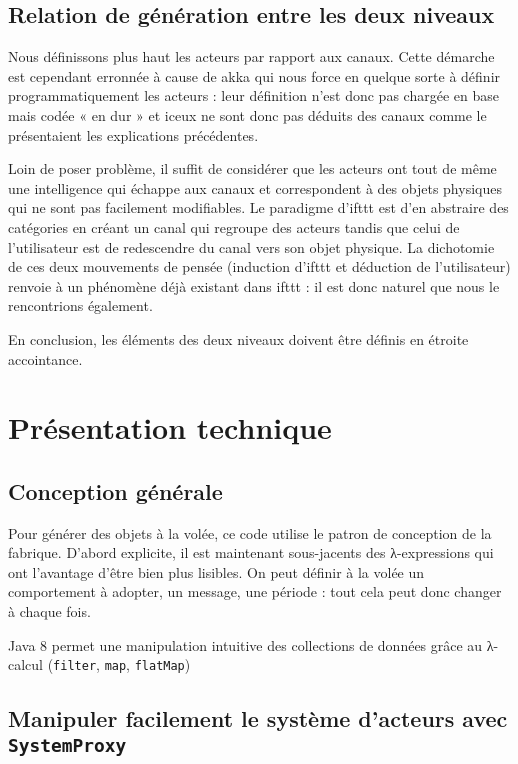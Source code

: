 \documentclass[11pt]{article}
\begin{document}
\subsection{Relation de génération entre les deux niveaux}

Nous définissons plus haut les acteurs par rapport aux canaux. Cette démarche est cependant erronnée à cause de akka qui nous force en quelque sorte à définir programmatiquement les acteurs : leur définition n'est donc pas chargée en base mais codée « en dur » et iceux ne sont donc pas déduits des canaux comme le présentaient les explications précédentes.

Loin de poser problème, il suffit de considérer que les acteurs ont tout de même une intelligence qui échappe aux canaux et correspondent à des objets physiques qui ne sont pas facilement modifiables. Le paradigme d'ifttt est d'en abstraire des catégories en créant un canal qui regroupe des acteurs tandis que celui de l'utilisateur est de redescendre du canal vers son objet physique. La dichotomie de ces deux mouvements de pensée (induction d'ifttt et déduction de l'utilisateur) renvoie à un phénomène déjà existant dans ifttt : il est donc naturel que nous le rencontrions également.

En conclusion, les éléments des deux niveaux doivent être définis en étroite accointance.

\section{Présentation technique}

\subsection{Conception générale}

Pour générer des objets à la volée, ce code utilise le patron de conception de la fabrique. D'abord explicite, il est maintenant sous-jacents des λ-expressions qui ont l'avantage d'être bien plus lisibles. On peut définir à la volée un comportement à adopter, un message, une période : tout cela peut donc changer à chaque fois. 

Java 8 permet une manipulation intuitive des collections de données grâce au λ-calcul (\texttt{filter}, \texttt{map}, \texttt{flatMap})

\subsection{Manipuler facilement le système d'acteurs avec \texttt{SystemProxy}}
\end{document}
